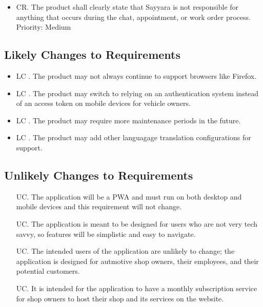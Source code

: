 \documentclass[12pt]{article}
\newcounter{crnum} %
\newcounter{lcnum} %
\newcounter{ucnum} %
\begin{document}
\begin {itemize}
    \item[CR\refstepcounter{crnum}\thecrnum \label{R_Output}.] The product shall clearly state that Sayyara is not responsible for anything that occurs during the chat, appointment, or work order process.\\
    Priority: Medium
\end {itemize}

\subsection{Likely Changes to Requirements}    

\begin {itemize}
    \item[LC\refstepcounter{lcnum}\thelcnum
    \label{R_Output}.] The product may not always continue to support browsers like Firefox.
    
    \item[LC\refstepcounter{lcnum}\thelcnum
    \label{R_Output}.] The product may switch to relying on an authentication system instead of an access token on mobile devices for vehicle owners.
    
    \item[LC\refstepcounter{lcnum}\thelcnum
    \label{R_Output}.] The product may require more maintenance periods in the future.
    
    \item[LC\refstepcounter{lcnum}\thelcnum
    \label{R_Output}.] The product may add other languagage translation configurations for support.
\end {itemize}

\subsection{Unlikely Changes to Requirements}    

\noindent \begin{itemize}

\item[UC\refstepcounter{ucnum}\theucnum\label{UC_meaningfulLabel}.] The application will be a PWA and must run on both desktop and mobile devices and this requirement will not change.

\item[UC\refstepcounter{ucnum}\theucnum\label{UC_meaningfulLabel}.] The application is meant to be designed for users who are not very tech savvy, so features will be simplistic and easy to navigate.

\item[UC\refstepcounter{ucnum}\theucnum\label{UC_meaningfulLabel}.] The intended users of the application are unlikely to change; the application is designed for autmotive shop owners, their employees, and their potential customers.

\item[UC\refstepcounter{ucnum}\theucnum\label{UC_meaningfulLabel}.] It is intended for the application to have a monthly subscription service for shop owners to host their shop and its services on the website.

\end{itemize}
\end{document}
